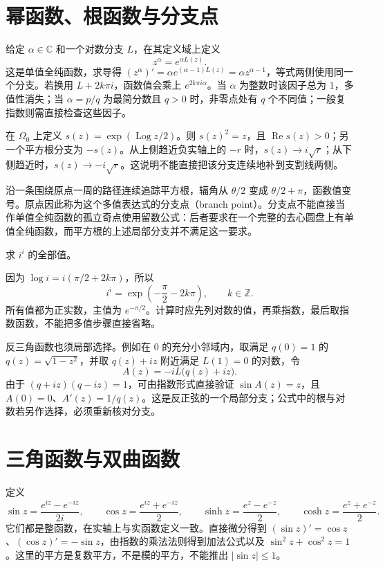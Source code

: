 \section{幂函数、根函数与分支点}

给定 $\alpha\in\mathbb C$ 和一个对数分支 $L$，在其定义域上定义
\[
 z^\alpha=e^{\alpha L(z)}.
\]
这是单值全纯函数，求导得 $(z^\alpha)'=\alpha e^{(\alpha-1)L(z)}=\alpha z^{\alpha-1}$，等式两侧使用同一个分支。若换用 $L+2k\pi i$，函数值会乘上 $e^{2k\pi i\alpha}$。当 $\alpha$ 为整数时该因子总为 $1$，多值性消失；当 $\alpha=p/q$ 为最简分数且 $q>0$ 时，非零点处有 $q$ 个不同值；一般复指数则需直接检查这些因子。

\begin{example}[平方根分支]
在 $\Omega_0$ 上定义 $s(z)=\exp(\operatorname{Log}z/2)$。则 $s(z)^2=z$，且 $\operatorname{Re}s(z)>0$；另一个平方根分支为 $-s(z)$。从上侧趋近负实轴上的 $-r$ 时，$s(z)\to i\sqrt r$；从下侧趋近时，$s(z)\to-i\sqrt r$。这说明不能直接把该分支连续地补到支割线两侧。
\end{example}

沿一条围绕原点一周的路径连续追踪平方根，辐角从 $\theta/2$ 变成 $\theta/2+\pi$，函数值变号。原点因此称为这个多值表达式的分支点（branch point）。分支点不能直接当作单值全纯函数的孤立奇点使用留数公式：后者要求在一个完整的去心圆盘上有单值全纯函数，而平方根的上述局部分支并不满足这一要求。

\begin{example}[复数幂也可能取实数值]
求 $i^i$ 的全部值。
\end{example}
\begin{solve}
因为 $\log i=i(\pi/2+2k\pi)$，所以
\[
 i^i=\exp\left(-\frac\pi2-2k\pi\right),\qquad k\in\mathbb Z.
\]
所有值都为正实数，主值为 $e^{-\pi/2}$。计算时应先列对数的值，再乘指数，最后取指数函数，不能把多值步骤直接省略。
\end{solve}

反三角函数也须局部选择。例如在 $0$ 的充分小邻域内，取满足 $q(0)=1$ 的 $q(z)=\sqrt{1-z^2}$，并取 $q(z)+iz$ 附近满足 $L(1)=0$ 的对数，令
\[
 A(z)=-iL\bigl(q(z)+iz\bigr).
\]
由于 $(q+iz)(q-iz)=1$，可由指数形式直接验证 $\sin A(z)=z$，且 $A(0)=0$、$A'(z)=1/q(z)$。这是反正弦的一个局部分支；公式中的根与对数若另作选择，必须重新核对分支。

\section{三角函数与双曲函数}

定义
\[
 \sin z=\frac{e^{iz}-e^{-iz}}{2i},\qquad
 \cos z=\frac{e^{iz}+e^{-iz}}2,
 \qquad
 \sinh z=\frac{e^z-e^{-z}}2,\qquad
 \cosh z=\frac{e^z+e^{-z}}2.
\]
它们都是整函数，在实轴上与实函数定义一致。直接微分得到 $(\sin z)'=\cos z$、$(\cos z)'=-\sin z$，由指数的乘法法则得到加法公式以及 $\sin^2z+\cos^2z=1$。这里的平方是复数平方，不是模的平方，不能推出 $|\sin z|\le1$。

